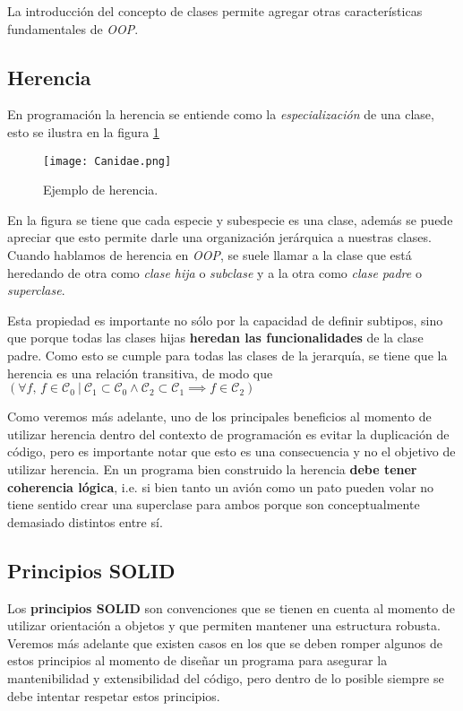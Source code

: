     La introducción del concepto de clases permite agregar otras características 
    fundamentales de \textit{OOP}.

    \subsection{Herencia}
      En programación la herencia se entiende como la \textit{especialización} de una 
      clase, esto se ilustra en la figura \ref{fig:canidae}\footnotemark

      \begin{figure}[ht!]
        \centering
        \texttt{[image: Canidae.png]}
        \caption{Ejemplo de herencia.}
        \label{fig:canidae}
      \end{figure}

      En la figura se tiene que cada especie y subespecie es una clase, además se 
      puede apreciar que esto permite darle una organización jerárquica a nuestras 
      clases.
      Cuando hablamos de herencia en \textit{OOP}, se suele llamar a la clase que está
      heredando de otra como \textit{clase hija} o \textit{subclase} y a la otra como 
      \textit{clase padre} o \textit{superclase}.
      
      Esta propiedad es importante no sólo por la capacidad de definir subtipos, sino 
      que porque todas las clases hijas \textbf{heredan las funcionalidades} de la 
      clase padre.
      Como esto se cumple para todas las clases de la jerarquía, se tiene que la 
      herencia es una relación transitiva, de modo que \((\forall f,\, f \in 
      \mathcal{C}_0\ |\ \mathcal{C}_1 \subset \mathcal{C}_0 \wedge \mathcal{C}_2 \subset 
      \mathcal{C}_1 \implies f \in \mathcal{C}_2)\) 

      Como veremos más adelante, uno de los principales beneficios al momento de 
      utilizar herencia dentro del contexto de programación es evitar la duplicación 
      de código, pero es importante notar que esto es una consecuencia y no el 
      objetivo de utilizar herencia.
      En un programa bien construido la herencia \textbf{debe tener coherencia 
      lógica}, i.e. si bien tanto un avión como un pato pueden volar no tiene sentido
      crear una superclase para ambos porque son conceptualmente demasiado distintos 
      entre sí.

    \subsection{Principios SOLID}
      Los \textbf{principios SOLID} son convenciones que se tienen en cuenta al momento de
      utilizar orientación a objetos y que permiten mantener una estructura robusta.
      Veremos más adelante que existen casos en los que se deben romper algunos de estos
      principios al momento de diseñar un programa para asegurar la mantenibilidad y 
      extensibilidad del código, pero dentro de lo posible siempre se debe intentar 
      respetar estos principios.

